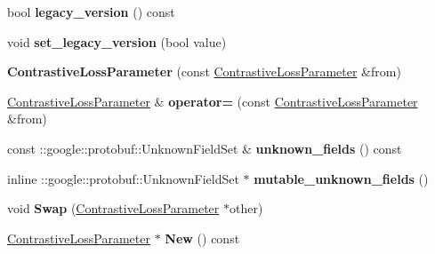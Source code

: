 \begin{DoxyCompactItemize}
\mbox{\label{classcaffe_1_1_contrastive_loss_parameter_aca1f3bb532400a17d5365ad7d5fba1ef}} 
bool {\bfseries legacy\+\_\+version} () const
\item 
\mbox{\label{classcaffe_1_1_contrastive_loss_parameter_ad8b13df62bc061aafcdf74e7cbba64d2}} 
void {\bfseries set\+\_\+legacy\+\_\+version} (bool value)
\item 
\mbox{\label{classcaffe_1_1_contrastive_loss_parameter_a17e143377bae21e208c541ea20637922}} 
{\bfseries Contrastive\+Loss\+Parameter} (const \mbox{\hyperlink{classcaffe_1_1_contrastive_loss_parameter}{Contrastive\+Loss\+Parameter}} \&from)
\item 
\mbox{\label{classcaffe_1_1_contrastive_loss_parameter_ac6c4e1f1780d2320ab143d1162acf8e6}} 
\mbox{\hyperlink{classcaffe_1_1_contrastive_loss_parameter}{Contrastive\+Loss\+Parameter}} \& {\bfseries operator=} (const \mbox{\hyperlink{classcaffe_1_1_contrastive_loss_parameter}{Contrastive\+Loss\+Parameter}} \&from)
\item 
\mbox{\label{classcaffe_1_1_contrastive_loss_parameter_a1c7b14c3983968d51b185c4eebff916e}} 
const \+::google\+::protobuf\+::\+Unknown\+Field\+Set \& {\bfseries unknown\+\_\+fields} () const
\item 
\mbox{\label{classcaffe_1_1_contrastive_loss_parameter_ae06b0de96f41d99b762a109c223cd89e}} 
inline \+::google\+::protobuf\+::\+Unknown\+Field\+Set $\ast$ {\bfseries mutable\+\_\+unknown\+\_\+fields} ()
\item 
\mbox{\label{classcaffe_1_1_contrastive_loss_parameter_ad3f53f5bf22eb0f79f9b3fb5afebdbaa}} 
void {\bfseries Swap} (\mbox{\hyperlink{classcaffe_1_1_contrastive_loss_parameter}{Contrastive\+Loss\+Parameter}} $\ast$other)
\item 
\mbox{\label{classcaffe_1_1_contrastive_loss_parameter_af39b2a86d8aaa21176d562698f30a368}} 
\mbox{\hyperlink{classcaffe_1_1_contrastive_loss_parameter}{Contrastive\+Loss\+Parameter}} $\ast$ {\bfseries New} () const

\end{DoxyCompactItemize}
